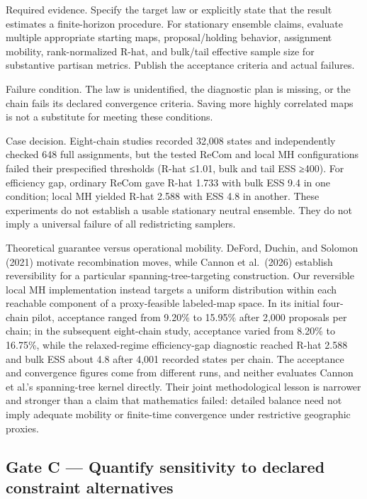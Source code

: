 \documentclass[
  10pt,
]{article}
\begin{document}
Required evidence. Specify the target law or explicitly state that the
result estimates a finite-horizon procedure. For stationary ensemble
claims, evaluate multiple appropriate starting maps, proposal/holding
behavior, assignment mobility, rank-normalized R-hat, and bulk/tail
effective sample size for substantive partisan metrics. Publish the
acceptance criteria and actual failures.

Failure condition. The law is unidentified, the diagnostic plan is
missing, or the chain fails its declared convergence criteria. Saving
more highly correlated maps is not a substitute for meeting these
conditions.

Case decision. Eight-chain studies recorded 32,008 states and
independently checked 648 full assignments, but the tested ReCom and
local MH configurations failed their prespecified thresholds (R-hat
≤1.01, bulk and tail ESS ≥400). For efficiency gap, ordinary ReCom gave
R-hat 1.733 with bulk ESS 9.4 in one condition; local MH yielded R-hat
2.588 with ESS 4.8 in another. These experiments do not establish a
usable stationary neutral ensemble. They do not imply a universal
failure of all redistricting samplers.

Theoretical guarantee versus operational mobility. DeFord, Duchin, and
Solomon (2021) motivate recombination moves, while Cannon et al.~(2026)
establish reversibility for a particular spanning-tree-targeting
construction. Our reversible local MH implementation instead targets a
uniform distribution within each reachable component of a proxy-feasible
labeled-map space. In its initial four-chain pilot, acceptance ranged
from 9.20\% to 15.95\% after 2,000 proposals per chain; in the
subsequent eight-chain study, acceptance varied from 8.20\% to 16.75\%,
while the relaxed-regime efficiency-gap diagnostic reached R-hat 2.588
and bulk ESS about 4.8 after 4,001 recorded states per chain. The
acceptance and convergence figures come from different runs, and neither
evaluates Cannon et al.'s spanning-tree kernel directly. Their joint
methodological lesson is narrower and stronger than a claim that
mathematics failed: detailed balance need not imply adequate mobility or
finite-time convergence under restrictive geographic proxies.

\hypertarget{gate-c-quantify-sensitivity-to-declared-constraint-alternatives}{%
\subsection{Gate C --- Quantify sensitivity to declared constraint
alternatives}\label{gate-c-quantify-sensitivity-to-declared-constraint-alternatives}}
\end{document}

